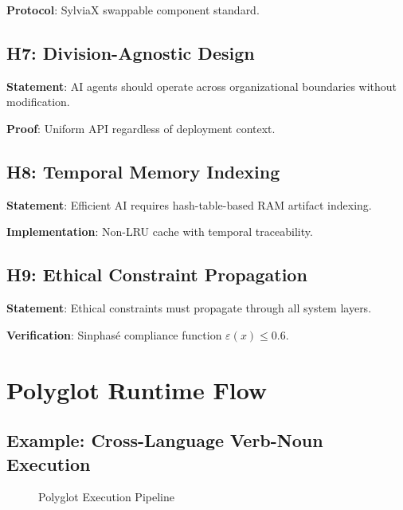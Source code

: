 \documentclass[12pt,a4paper]{article}
\begin{document}
\textbf{Protocol}: SylviaX swappable component standard.

\subsection{H7: Division-Agnostic Design}
\textbf{Statement}: AI agents should operate across organizational boundaries without modification.

\textbf{Proof}: Uniform API regardless of deployment context.

\subsection{H8: Temporal Memory Indexing}
\textbf{Statement}: Efficient AI requires hash-table-based RAM artifact indexing.

\textbf{Implementation}: Non-LRU cache with temporal traceability.

\subsection{H9: Ethical Constraint Propagation}
\textbf{Statement}: Ethical constraints must propagate through all system layers.

\textbf{Verification}: Sinphasé compliance function $\varepsilon(x) \leq 0.6$.

\section{Polyglot Runtime Flow}

\subsection{Example: Cross-Language Verb-Noun Execution}

\begin{figure}[h]
\centering
{}
\caption{Polyglot Execution Pipeline}
\end{figure}
\end{document}
